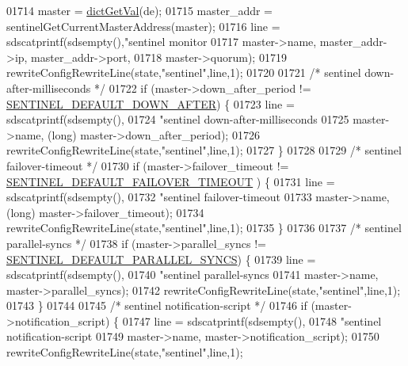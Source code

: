 \begin{DoxyCode}
{{{{{{{{{{{{{{{{{{{01714         master = \hyperlink{dict_8h_ae8d2cc391873b2bea2b87c4f80f43120}{dictGetVal}(de);
01715         master\_addr = sentinelGetCurrentMasterAddress(master);
01716         line = sdscatprintf(sdsempty(),\textcolor{stringliteral}{"sentinel monitor %
01717             master->name, master\_addr->ip, master\_addr->port,
01718             master->quorum);
01719         rewriteConfigRewriteLine(state,\textcolor{stringliteral}{"sentinel"},line,1);
01720 
01721         \textcolor{comment}{/* sentinel down-after-milliseconds */}
01722         \textcolor{keywordflow}{if} (master->down\_after\_period != \hyperlink{sentinel_8c_a8d75144bfd53c71ce519a97de5016857}{SENTINEL\_DEFAULT\_DOWN\_AFTER}) \{
01723             line = sdscatprintf(sdsempty(),
01724                 \textcolor{stringliteral}{"sentinel down-after-milliseconds %
01725                 master->name, (\textcolor{keywordtype}{long}) master->down\_after\_period);
01726             rewriteConfigRewriteLine(state,\textcolor{stringliteral}{"sentinel"},line,1);
01727         \}
01728 
01729         \textcolor{comment}{/* sentinel failover-timeout */}
01730         \textcolor{keywordflow}{if} (master->failover\_timeout != \hyperlink{sentinel_8c_a562b5124572b4d837a34b98c41ef391d}{SENTINEL\_DEFAULT\_FAILOVER\_TIMEOUT}
      ) \{
01731             line = sdscatprintf(sdsempty(),
01732                 \textcolor{stringliteral}{"sentinel failover-timeout %
01733                 master->name, (\textcolor{keywordtype}{long}) master->failover\_timeout);
01734             rewriteConfigRewriteLine(state,\textcolor{stringliteral}{"sentinel"},line,1);
01735         \}
01736 
01737         \textcolor{comment}{/* sentinel parallel-syncs */}
01738         \textcolor{keywordflow}{if} (master->parallel\_syncs != \hyperlink{sentinel_8c_a7cfe6cf48e367486681eb21e53c65dc9}{SENTINEL\_DEFAULT\_PARALLEL\_SYNCS}) 
      \{
01739             line = sdscatprintf(sdsempty(),
01740                 \textcolor{stringliteral}{"sentinel parallel-syncs %
01741                 master->name, master->parallel\_syncs);
01742             rewriteConfigRewriteLine(state,\textcolor{stringliteral}{"sentinel"},line,1);
01743         \}
01744 
01745         \textcolor{comment}{/* sentinel notification-script */}
01746         \textcolor{keywordflow}{if} (master->notification\_script) \{
01747             line = sdscatprintf(sdsempty(),
01748                 \textcolor{stringliteral}{"sentinel notification-script %
01749                 master->name, master->notification\_script);
01750             rewriteConfigRewriteLine(state,\textcolor{stringliteral}{"sentinel"},line,1);
}}}}}}}}}}}}}}}}}}}}}}}}
\end{DoxyCode}
